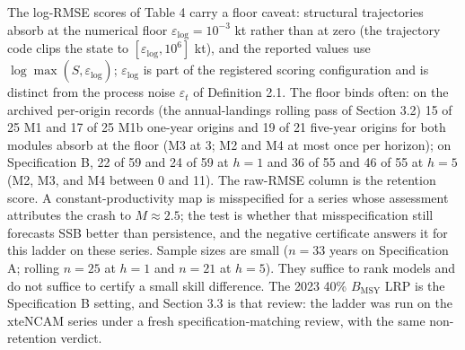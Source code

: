 \documentclass[11pt]{article}
\begin{document}
The log-RMSE scores of Table 4 carry a floor caveat: structural
trajectories absorb at the numerical floor
\(\varepsilon_{\mathrm{log}} = 10^{-3}\) kt rather than at zero (the
trajectory code clips the state to
\([\varepsilon_{\mathrm{log}}, 10^{6}]\) kt), and the reported values
use \(\log\max(\hat S, \varepsilon_{\mathrm{log}})\);
\(\varepsilon_{\mathrm{log}}\) is part of the registered scoring
configuration and is distinct from the process noise \(\varepsilon_t\)
of Definition 2.1. The floor binds often: on the archived per-origin
records (the annual-landings rolling pass of Section 3.2) 15 of 25 M1
and 17 of 25 M1b one-year origins and 19 of 21 five-year origins for
both modules absorb at the floor (M3 at 3; M2 and M4 at most once per
horizon); on Specification B, 22 of 59 and 24 of 59 at \(h=1\) and 36 of
55 and 46 of 55 at \(h=5\) (M2, M3, and M4 between 0 and 11). The
raw-RMSE column is the retention score. A constant-productivity map is
misspecified for a series whose assessment attributes the crash to
\(M \approx 2.5\); the test is whether that misspecification still
forecasts SSB better than persistence, and the negative certificate
answers it for this ladder on these series. Sample sizes are small
(\(n=33\) years on Specification A; rolling \(n=25\) at \(h=1\) and
\(n=21\) at \(h=5\)). They suffice to rank models and do not suffice to
certify a small skill difference. The 2023 40\% \(B_{\mathrm{MSY}}\) LRP
is the Specification B setting, and Section 3.3 is that review: the
ladder was run on the xteNCAM series under a fresh
specification-matching review, with the same non-retention verdict.
\end{document}
